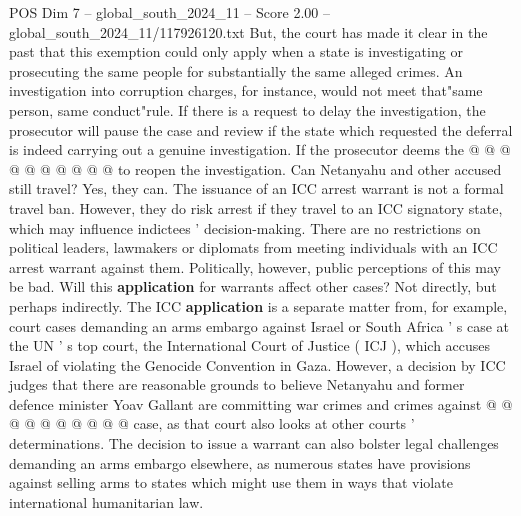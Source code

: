 \begin{textsample}{POS Dim 7 – global\_south\_2024\_11 – Score 2.00 – global\_south\_2024\_11/117926120.txt}
But, the court has made it clear in the past that this exemption could only apply when a state is investigating or prosecuting the same people for substantially the same alleged crimes.
An investigation into corruption charges, for instance, would not meet that"same person, same conduct"rule.
If there is a request to delay the investigation, the prosecutor will pause the case and review if the state which requested the deferral is indeed carrying out a genuine investigation.
If the prosecutor deems the @ @ @ @ @ @ @ @ @ @ to reopen the investigation.
Can Netanyahu and other accused still travel?
Yes, they can.
The issuance of an ICC arrest warrant is not a formal travel ban.
However, they do risk arrest if they travel to an ICC signatory state, which may influence indictees ' decision-making.
There are no restrictions on political leaders, lawmakers or diplomats from meeting individuals with an ICC arrest warrant against them.
Politically, however, public perceptions of this may be bad.
Will this \textbf{application} for warrants affect other cases?
Not directly, but perhaps indirectly.
The ICC \textbf{application} is a separate matter from, for example, court cases demanding an arms embargo against Israel or South Africa ' s case at the UN ' s top court, the International Court of Justice ( ICJ ), which accuses Israel of violating the Genocide Convention in Gaza.
However, a decision by ICC judges that there are reasonable grounds to believe Netanyahu and former defence minister Yoav Gallant are committing war crimes and crimes against @ @ @ @ @ @ @ @ @ @ case, as that court also looks at other courts ' determinations.
The decision to issue a warrant can also bolster legal challenges demanding an arms embargo elsewhere, as numerous states have provisions against selling arms to states which might use them in ways that violate international humanitarian law.

\end{textsample}

